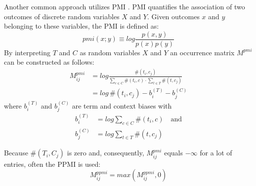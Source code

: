Another common approach utilizes \acl{PMI} \autocite{church_word_1990}. \acf{PMI} quantifies the association of two outcomes of discrete random variables $X$ and $Y$. Given outcomes $x$ and $y$ belonging to these variables, the \ac{PMI} is defined as:
\begin{equation}
	pmi(x;y) \equiv log\frac{p(x,y)}{p(x)p(y)}
\end{equation}
By interpreting $T$ and $C$ as random variables $X$ and $Y$ an occurrence matrix $M^{pmi}$ 
can be constructed as follows:
\begin{equation}
\begin{split} \label{eq:m_pmi}
M^{pmi}_{ij} & = log\frac{\#(t_i, c_j)}{\sum\limits_{c \in C}\#(t_i, c) \cdot \sum\limits_{t \in T}\#(t,c_j)} \\
 & = log\,\#(t_i, c_j) - b_i^{(T)} - b_j^{(C)}
\end{split}
\end{equation}
where $b_i^{(T)}$ and $b_j^{(C)}$ are term and context biases with
\begin{equation} 
\begin{split}
b_i^{(T)} & = log \sum\limits_{c \in C}\#(t_i, c) \quad \text{and} \\
b_j^{(C)} & = log \sum\limits_{t \in T}\#(t,c_j)
\end{split}
\end{equation}

Because $\#(T_i, C_j)$ is zero and, consequently, $M^{pmi}_{ij}$ equals $-\infty$ for a lot of entries, often the \ac{PPMI} \autocite{niwa_co-occurrence_1994} is used:
\begin{equation}
M^{ppmi}_{ij} = max(M^{ppmi}_{ij}, 0)
\end{equation}

